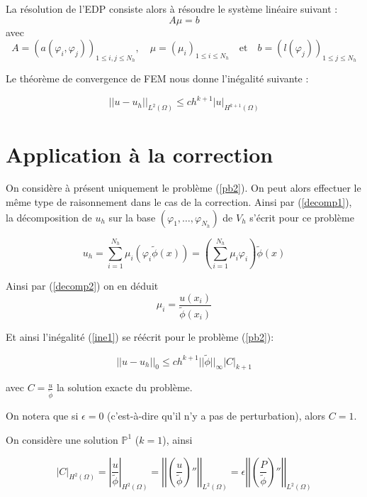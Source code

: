 La résolution de l'EDP consiste alors à résoudre le système linéaire suivant :
$$A\mu=b$$
avec
$$A=(a(\varphi_i,\varphi_j))_{1\le i,j\le N_h}, \quad \mu=(\mu_i)_{1\le i\le N_h} \quad \text{et} \quad b=(l(\varphi_j))_{1\le j\le N_h}$$

Le théorème de convergence de FEM nous donne l'inégalité suivante :

\begin{equation}
	||u-u_h||_{L^2(\Omega)}\le ch^{k+1}|u|_{H^{k+1}(\Omega)} \label{ine1}
\end{equation}

\section*{Application à la correction}

On considère à présent uniquement le problème (\ref{pb2}). On peut alors effectuer le même type de raisonnement dans le cas de la correction. Ainsi par (\ref{decomp1}), la décomposition de $u_h$ sur la base $(\varphi_1,\dots,\varphi_{N_h})$ de $V_h$ s'écrit pour ce problème

\begin{equation}
	u_h=\sum_{i=1}^{N_h}\mu_i(\varphi_i\tilde{\phi}(x))=\left(\sum_{i=1}^{N_h}\mu_i\varphi_i\right)\tilde{\phi}(x) \label{decomp2}
\end{equation}

Ainsi par (\ref{decomp2}) on en déduit
$$\mu_i=\frac{u(x_i)}{\tilde{\phi}(x_i)}$$

Et ainsi l'inégalité (\ref{ine1}) se réécrit pour le problème (\ref{pb2}):

\begin{equation}
	\left|\left|u-u_h\right|\right|_0\le ch^{k+1}||\tilde{\phi}||_\infty\left|C\right|_{k+1}
	\label{ine2}
\end{equation}

avec $C=\frac{u}{\tilde{\phi}}$ la solution exacte du problème.

\begin{Rem}
	On notera que si $\epsilon=0$ (c'est-à-dire qu'il n'y a pas de perturbation), alors $C=1$.
\end{Rem}

On considère une solution $\mathbb{P}^1$ ($k=1$), ainsi

\begin{equation}
	|C|_{H^2(\Omega)}=\left|\frac{u}{\tilde{\phi}}\right|_{H^2(\Omega)}=\left|\left|\left(\frac{u}{\tilde{\phi}}\right)''\right|\right|_{L^2(\Omega)}=\epsilon\left|\left|\left(\frac{P}{\tilde{\phi}}\right)''\right|\right|_{L^2(\Omega)} \label{der1}
\end{equation}

